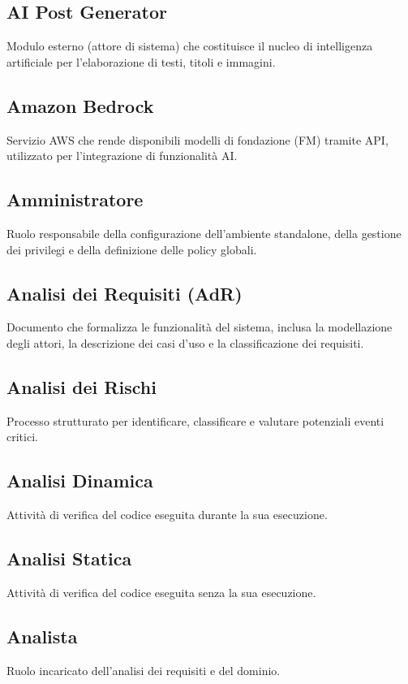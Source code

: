 \documentclass[a4paper,12pt]{article}
\begin{document}
\subsection{AI Post Generator}
Modulo esterno (attore di sistema) che costituisce il nucleo di intelligenza artificiale per l'elaborazione di testi, titoli e immagini.

\subsection{Amazon Bedrock}
Servizio AWS che rende disponibili modelli di fondazione (FM) tramite API, utilizzato per l'integrazione di funzionalità AI.

\subsection{Amministratore}
Ruolo responsabile della configurazione dell'ambiente standalone, della gestione dei privilegi e della definizione delle policy globali.

\subsection{Analisi dei Requisiti (AdR)}
Documento che formalizza le funzionalità del sistema, inclusa la modellazione degli attori, la descrizione dei casi d'uso e la classificazione dei requisiti.

\subsection{Analisi dei Rischi}
Processo strutturato per identificare, classificare e valutare potenziali eventi critici.

\subsection{Analisi Dinamica}
Attività di verifica del codice eseguita durante la sua esecuzione.

\subsection{Analisi Statica}
Attività di verifica del codice eseguita senza la sua esecuzione.

\subsection{Analista}
Ruolo incaricato dell'analisi dei requisiti e del dominio.
\end{document}
